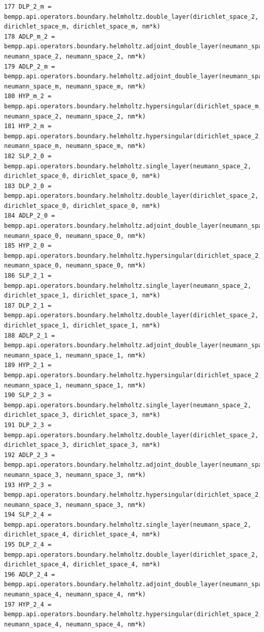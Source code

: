 \documentclass[12pt,letterpaper]{article}
\numberwithin{equation}{section}
\begin{document}
\begin{lstlisting}
177 DLP_2_m = bempp.api.operators.boundary.helmholtz.double_layer(dirichlet_space_2, dirichlet_space_m, dirichlet_space_m, nm*k)
178 ADLP_m_2 = bempp.api.operators.boundary.helmholtz.adjoint_double_layer(neumann_space_m, neumann_space_2, neumann_space_2, nm*k)
179 ADLP_2_m = bempp.api.operators.boundary.helmholtz.adjoint_double_layer(neumann_space_2, neumann_space_m, neumann_space_m, nm*k)
180 HYP_m_2 = bempp.api.operators.boundary.helmholtz.hypersingular(dirichlet_space_m, neumann_space_2, neumann_space_2, nm*k)
181 HYP_2_m = bempp.api.operators.boundary.helmholtz.hypersingular(dirichlet_space_2, neumann_space_m, neumann_space_m, nm*k)
182 SLP_2_0 = bempp.api.operators.boundary.helmholtz.single_layer(neumann_space_2, dirichlet_space_0, dirichlet_space_0, nm*k)
183 DLP_2_0 = bempp.api.operators.boundary.helmholtz.double_layer(dirichlet_space_2, dirichlet_space_0, dirichlet_space_0, nm*k)
184 ADLP_2_0 = bempp.api.operators.boundary.helmholtz.adjoint_double_layer(neumann_space_2, neumann_space_0, neumann_space_0, nm*k)
185 HYP_2_0 = bempp.api.operators.boundary.helmholtz.hypersingular(dirichlet_space_2, neumann_space_0, neumann_space_0, nm*k)
186 SLP_2_1 = bempp.api.operators.boundary.helmholtz.single_layer(neumann_space_2, dirichlet_space_1, dirichlet_space_1, nm*k)
187 DLP_2_1 = bempp.api.operators.boundary.helmholtz.double_layer(dirichlet_space_2, dirichlet_space_1, dirichlet_space_1, nm*k)
188 ADLP_2_1 = bempp.api.operators.boundary.helmholtz.adjoint_double_layer(neumann_space_2, neumann_space_1, neumann_space_1, nm*k)
189 HYP_2_1 = bempp.api.operators.boundary.helmholtz.hypersingular(dirichlet_space_2, neumann_space_1, neumann_space_1, nm*k)
190 SLP_2_3 = bempp.api.operators.boundary.helmholtz.single_layer(neumann_space_2, dirichlet_space_3, dirichlet_space_3, nm*k)
191 DLP_2_3 = bempp.api.operators.boundary.helmholtz.double_layer(dirichlet_space_2, dirichlet_space_3, dirichlet_space_3, nm*k)
192 ADLP_2_3 = bempp.api.operators.boundary.helmholtz.adjoint_double_layer(neumann_space_2, neumann_space_3, neumann_space_3, nm*k)
193 HYP_2_3 = bempp.api.operators.boundary.helmholtz.hypersingular(dirichlet_space_2, neumann_space_3, neumann_space_3, nm*k)
194 SLP_2_4 = bempp.api.operators.boundary.helmholtz.single_layer(neumann_space_2, dirichlet_space_4, dirichlet_space_4, nm*k)
195 DLP_2_4 = bempp.api.operators.boundary.helmholtz.double_layer(dirichlet_space_2, dirichlet_space_4, dirichlet_space_4, nm*k)
196 ADLP_2_4 = bempp.api.operators.boundary.helmholtz.adjoint_double_layer(neumann_space_2, neumann_space_4, neumann_space_4, nm*k)
197 HYP_2_4 = bempp.api.operators.boundary.helmholtz.hypersingular(dirichlet_space_2, neumann_space_4, neumann_space_4, nm*k)

\end{lstlisting}
\end{document}
